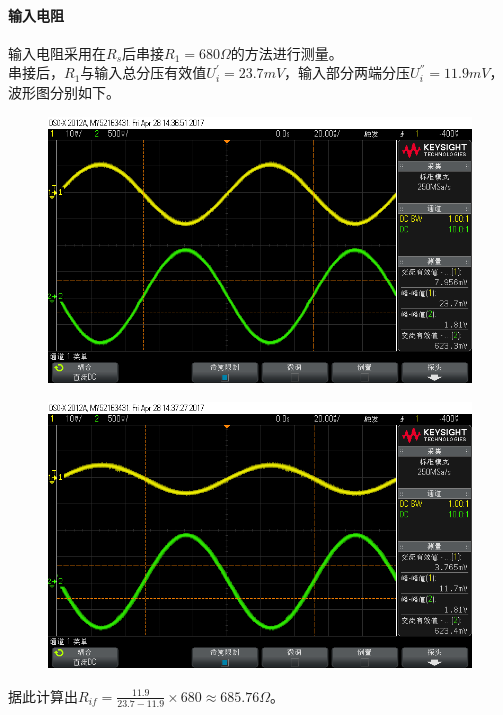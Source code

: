 \documentclass[12pt,a4paper]{article}
\begin{document}
\begin{spacing}{1.3}
\paragraph{输入电阻} 输入电阻采用在$R_s$后串接$R_1=680\Omega$的方法进行测量。\\
串接后，$R_1$与输入总分压有效值$U_{i}^{'}=23.7mV$，输入部分两端分压$U_{i}^{''}=11.9mV$，波形图分别如下。
\begin{figure}[H]
\centering
\includegraphics[width=\textwidth]{scope_2.png}
\end{figure}
\begin{figure}[H]
\centering
\includegraphics[width=\textwidth]{scope_3.png}
\end{figure}
据此计算出$R_{if}=\frac{11.9}{23.7-11.9}\times 680 \approx 685.76\Omega$。\\

\end{spacing}
\end{document}
